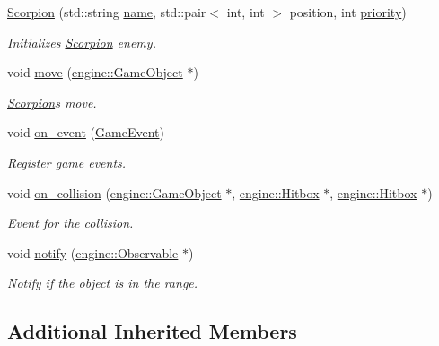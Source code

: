 \begin{DoxyCompactItemize}
\item 
\hyperlink{classmindscape_1_1_scorpion_a4177d8e6e1dc80f806d081341cfdfbf9}{Scorpion} (std\+::string \hyperlink{classengine_1_1_game_object_a1f104f7af4f351e6d3278319762c9fe5}{name}, std\+::pair$<$ int, int $>$ position, int \hyperlink{classengine_1_1_game_object_a159ecaca30229e302793b11a75bd13c2}{priority})
\begin{DoxyCompactList}\small\item\em Initializes \hyperlink{classmindscape_1_1_scorpion}{Scorpion} enemy. \end{DoxyCompactList}\item 
void \hyperlink{classmindscape_1_1_scorpion_af5dc16c6dce9db3cc266a9ba59b4c0a9}{move} (\hyperlink{classengine_1_1_game_object}{engine\+::\+Game\+Object} $\ast$)
\begin{DoxyCompactList}\small\item\em \hyperlink{classmindscape_1_1_scorpion}{Scorpion}\textquotesingle{}s move. \end{DoxyCompactList}\item 
void \hyperlink{classmindscape_1_1_scorpion_a5e0aa8fda5f9e6264beb428368077da9}{on\+\_\+event} (\hyperlink{class_game_event}{Game\+Event})
\begin{DoxyCompactList}\small\item\em Register game events. \end{DoxyCompactList}\item 
void \hyperlink{classmindscape_1_1_scorpion_ab1b64d05f6f0280830132ddf46d13242}{on\+\_\+collision} (\hyperlink{classengine_1_1_game_object}{engine\+::\+Game\+Object} $\ast$, \hyperlink{classengine_1_1_hitbox}{engine\+::\+Hitbox} $\ast$, \hyperlink{classengine_1_1_hitbox}{engine\+::\+Hitbox} $\ast$)
\begin{DoxyCompactList}\small\item\em Event for the collision. \end{DoxyCompactList}\item 
void \hyperlink{classmindscape_1_1_scorpion_aaa94c9c620ff2fe58e8315ac1112aeb5}{notify} (\hyperlink{classengine_1_1_observable}{engine\+::\+Observable} $\ast$)
\begin{DoxyCompactList}\small\item\em Notify if the object is in the range. \end{DoxyCompactList}\end{DoxyCompactItemize}
\subsection*{Additional Inherited Members}


